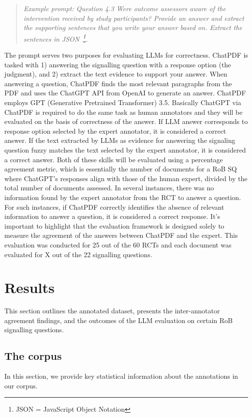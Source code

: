 \documentclass[sn-mathphys,Numbered]{sn-jnl}%
\theoremstyle{thmstyleone}%
\theoremstyle{thmstyletwo}%
\theoremstyle{thmstylethree}%
\begin{document}
\begin{quote}
\itshape Example prompt: Question 4.3 Were outcome assessors aware of the intervention received by study participants? Provide an answer and extract the supporting sentences that you write your answer based on. Extract the sentences in JSON~\footnote{JSON = JavaScript Object Notation}.
\end{quote}

The prompt serves two purposes for evaluating LLMs for correctness.
ChatPDF is tasked with 1) answering the signalling question with a response option (the judgment), and 2) extract the text evidence to support your answer.
When answering a question, ChatPDF finds the most relevant paragraphs from the PDF and uses the ChatGPT API from OpenAI to generate an answer.
ChatPDF employs GPT (Generative Pretrained Transformer) 3.5.
Basically ChatGPT via ChatPDF is required to do the same task as human annotators and they will be evaluated on the basis of correctness of the answer.
If LLM answer corresponds to response option selected by the expert annotator, it is considered a correct answer. 
If the text extracted by LLMs as evidence for answering the signaling question fuzzy matches the text selected by the expert annotator, it is considered a correct answer.
Both of these skills will be evaluated using a percentage agreement metric, which is essentially the number of documents for a RoB SQ where ChatGPT's responses align with those of the human expert, divided by the total number of documents assessed.
In several instances, there was no information found by the expert annotator from the RCT to answer a question. 
For such instances, if ChatPDF correctly identifies the absence of relevant information to answer a question, it is considered a correct response.
It's important to highlight that the evaluation framework is designed solely to measure the agreement of the answers between ChatPDF and the expert.
This evaluation was conducted for 25 out of the 60 RCTs and each document was evaluated for X out of the 22 signalling questions.
%
%
%
\section{Results}
\label{sec:results}
%
This section outlines the annotated dataset, presents the inter-annotator agreement findings, and the outcomes of the LLM evaluation on certain RoB signalling questions.
%
%
%
\subsection{The corpus}
\label{subsec:corpus}
%
In this section, we provide key statistical information about the annotations in our corpus.
\end{document}
